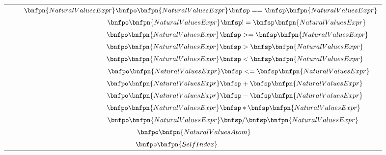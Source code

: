 \begin{longtable}{  c  }
    \\
    $\hspace{0.8cm} \bnfpn{NaturalValuesExpr} \bnfpo \bnfpn{NaturalValuesExpr} \bnfsp == \bnfsp \bnfpn{NaturalValuesExpr}$       \\
    $\hspace{4.5cm} \bnfpo \bnfpn{NaturalValuesExpr} \bnfsp != \bnfsp \bnfpn{NaturalValuesExpr}$                                 \\
    $\hspace{4.6cm} \bnfpo \bnfpn{NaturalValuesExpr} \bnfsp >= \bnfsp \bnfpn{NaturalValuesExpr}$                                 \\
    $\hspace{4.3cm} \bnfpo \bnfpn{NaturalValuesExpr} \bnfsp > \bnfsp \bnfpn{NaturalValuesExpr}$                                  \\
    $\hspace{4.3cm} \bnfpo \bnfpn{NaturalValuesExpr} \bnfsp < \bnfsp \bnfpn{NaturalValuesExpr}$                                  \\
    $\hspace{4.7cm} \bnfpo \bnfpn{NaturalValuesExpr} \bnfsp <= \bnfsp \bnfpn{NaturalValuesExpr}$                                 \\
    $\hspace{4.3cm} \bnfpo \bnfpn{NaturalValuesExpr} \bnfsp + \bnfsp \bnfpn{NaturalValuesExpr}$                                  \\
    $\hspace{4.3cm} \bnfpo \bnfpn{NaturalValuesExpr} \bnfsp - \bnfsp \bnfpn{NaturalValuesExpr}$                                  \\
    $\hspace{4.2cm} \bnfpo \bnfpn{NaturalValuesExpr} \bnfsp * \bnfsp \bnfpn{NaturalValuesExpr}$                                  \\
    $\hspace{4.1cm} \bnfpo \bnfpn{NaturalValuesExpr} \bnfsp / \bnfsp \bnfpn{NaturalValuesExpr}$                                  \\
    $\hspace{0.1cm} \bnfpo \bnfpn{NaturalValuesAtom}$                                                                            \\
    $\hspace{-1.7cm} \bnfpo \bnfpn{SelfIndex}$                                                                                   \\


\end{longtable}

